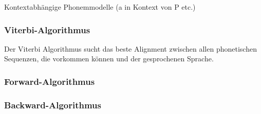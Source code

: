 Kontextabhängige Phonemmodelle (a in Kontext von P etc.)

\subsubsection{Viterbi-Algorithmus}
\label{sssect:viterbi-algorithmus}
Der Viterbi Algorithmus sucht das beste Alignment zwischen allen phonetischen Sequenzen, die vorkommen können und der gesprochenen Sprache.
\subsubsection{Forward-Algorithmus}
\label{sssect:forward-algorithmus}

\subsubsection{Backward-Algorithmus}
\label{sssect:backward-algorithmus}

\newpage